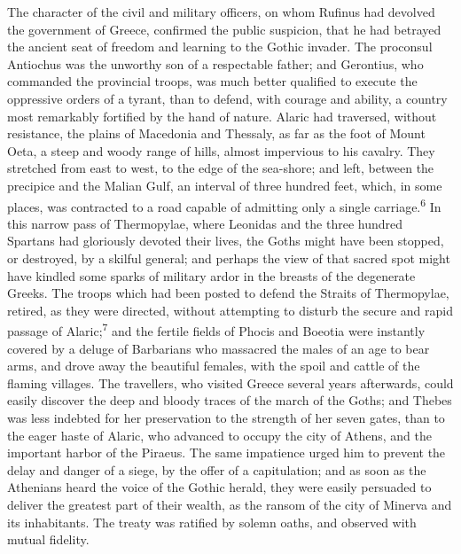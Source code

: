 
The character of the civil and military officers, on whom Rufinus
had devolved the government of Greece, confirmed the public
suspicion, that he had betrayed the ancient seat of freedom and
learning to the Gothic invader. The proconsul Antiochus was the
unworthy son of a respectable father; and Gerontius, who
commanded the provincial troops, was much better qualified to
execute the oppressive orders of a tyrant, than to defend, with
courage and ability, a country most remarkably fortified by the
hand of nature. Alaric had traversed, without resistance, the
plains of Macedonia and Thessaly, as far as the foot of Mount
Oeta, a steep and woody range of hills, almost impervious to his
cavalry. They stretched from east to west, to the edge of the
sea-shore; and left, between the precipice and the Malian Gulf,
an interval of three hundred feet, which, in some places, was
contracted to a road capable of admitting only a single carriage.\textsuperscript{6}
In this narrow pass of Thermopylae, where Leonidas and the
three hundred Spartans had gloriously devoted their lives, the
Goths might have been stopped, or destroyed, by a skilful
general; and perhaps the view of that sacred spot might have
kindled some sparks of military ardor in the breasts of the
degenerate Greeks. The troops which had been posted to defend the
Straits of Thermopylae, retired, as they were directed, without
attempting to disturb the secure and rapid passage of Alaric;\textsuperscript{7}
and the fertile fields of Phocis and Boeotia were instantly
covered by a deluge of Barbarians who massacred the males of an
age to bear arms, and drove away the beautiful females, with the
spoil and cattle of the flaming villages. The travellers, who
visited Greece several years afterwards, could easily discover
the deep and bloody traces of the march of the Goths; and Thebes
was less indebted for her preservation to the strength of her
seven gates, than to the eager haste of Alaric, who advanced to
occupy the city of Athens, and the important harbor of the
Piraeus. The same impatience urged him to prevent the delay and
danger of a siege, by the offer of a capitulation; and as soon as
the Athenians heard the voice of the Gothic herald, they were
easily persuaded to deliver the greatest part of their wealth, as
the ransom of the city of Minerva and its inhabitants. The treaty
was ratified by solemn oaths, and observed with mutual fidelity.
